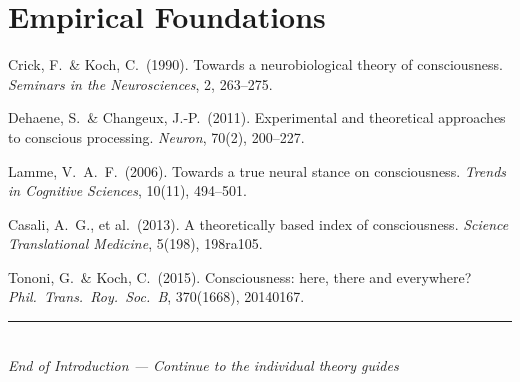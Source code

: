 \documentclass[11pt,a4paper]{report}
\begin{document}
\section*{Empirical Foundations}
\begin{enumerate}[label={[\arabic*]}, leftmargin=2.5em, start=18]
  \item Crick, F.\ \& Koch, C.\ (1990). Towards a neurobiological theory of consciousness. \textit{Seminars in the Neurosciences}, 2, 263--275.
  \item Dehaene, S.\ \& Changeux, J.-P.\ (2011). Experimental and theoretical approaches to conscious processing. \textit{Neuron}, 70(2), 200--227.
  \item Lamme, V.\ A.\ F.\ (2006). Towards a true neural stance on consciousness. \textit{Trends in Cognitive Sciences}, 10(11), 494--501.
  \item Casali, A.\ G., et al.\ (2013). A theoretically based index of consciousness. \textit{Science Translational Medicine}, 5(198), 198ra105.
  \item Tononi, G.\ \& Koch, C.\ (2015). Consciousness: here, there and everywhere? \textit{Phil.\ Trans.\ Roy.\ Soc.\ B}, 370(1668), 20140167.
\end{enumerate}

\vfill
\begin{center}
  {\color{gray}\rule{0.4\textwidth}{0.5pt}}\\[8pt]
  {\small\color{gray}\itshape End of Introduction --- Continue to the individual theory guides}
\end{center}
\end{document}

